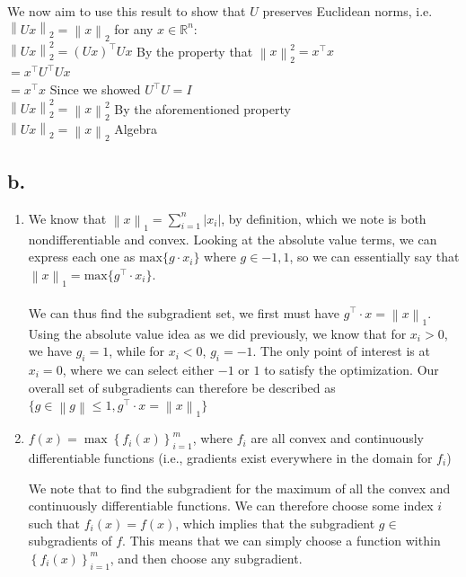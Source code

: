 \documentclass{article}
\newcommand{\field}[1]{\mathbb{#1}}
\newcommand{\1}{\mathbf{1}}
\newcommand{\R}{\field{R}} %
\newcommand{\norm}[1]{\left\|#1\right\|}
\begin{document}
{\begin{enumerate}
  We now aim to use this result to show that $U$ preserves Euclidean norms, i.e. $\norm{U x}_2 = \norm{x}_2$ for any $x\in \R^n$: \\
  $\norm{U x}^2_2 = (Ux)^\top Ux$ \hfill By the property that $\norm{x}^2_2 = x^\top x$ \\
  $= x^\top U^\top Ux$ \\
  $= x^\top x$ \hfill Since we showed $U^\top U = I$ \\
  $\norm{U x}^2_2 = \norm{x}^2_2$ \hfill By the aforementioned property \\
  $\norm{U x}_2 = \norm{x}_2$ \hfill Algebra \\


\end{enumerate}

\subsection*{b.}

\begin{enumerate}
  \item 
  We know that $\norm{x}_1 = \sum_{i=1}^{n} |x_i|$, by definition, which we note is both nondifferentiable and convex. Looking at the absolute value terms, we can express each one as $\text{max} \{ g \cdot x_i \}$ where $g \in {-1, 1}$, so we can essentially say that $\norm{x}_1 = \text{max}\{g^\top \cdot x_i\}$. \\ \\
  We can thus find the subgradient set, we first must have $g^\top \cdot x = \norm{x}_1$. Using the absolute value idea as we did previously, we know that for $x_i > 0$, we have $g_i = 1$, while for $x_i < 0$, $g_i = -1$. The only point of interest is at $x_i = 0$, where we can select either $-1$ or $1$ to satisfy the optimization. Our overall set of subgradients can therefore be described as \\
  $\{g \in \norm{g} \leq 1, g^\top \cdot x = \norm{x}_1\}$

  \item $f(x) = \max \left\{f_i(x)\right\}_{i =1}^m$, where $f_i$ are all convex and continuously differentiable functions (i.e., gradients exist everywhere in the domain for $f_i$)
  
  We note that to find the subgradient for the maximum of all the convex and continuously differentiable functions. We can therefore choose some index $i$ such that $f_i(x) = f(x)$, which implies that the subgradient $g \in $ subgradients of $f$. This means that we can simply choose a function within $\left\{f_i(x)\right\}_{i =1}^m$, and then choose any subgradient. 


\end{enumerate}}
\end{document}
